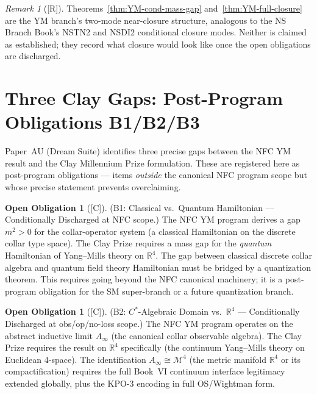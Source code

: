 \documentclass[12pt,oneside]{amsbook}
\theoremstyle{plain}
\theoremstyle{definition}
\newtheorem{obligation}[theorem]{Open Obligation}
\theoremstyle{remark}
\newtheorem{remark}[theorem]{Remark}
\newcommand{\status}[1]{\textup{[#1]}}
\begin{document}
\begin{remark}[\status{R}]
Theorems~\ref{thm:YM-cond-mass-gap} and~\ref{thm:YM-full-closure}
are the YM branch's two-mode near-closure structure, analogous to
the NS Branch Book's NSTN2 and NSDI2 conditional closure modes.
Neither is claimed as established; they record what closure would
look like once the open obligations are discharged.
\end{remark}

\section{Three Clay Gaps: Post-Program Obligations B1/B2/B3}
\label{sec:clay-gaps}

Paper~AU (Dream Suite) identifies three precise gaps between the
NFC YM result and the Clay Millennium Prize formulation. These
are registered here as post-program obligations --- items
\emph{outside} the canonical NFC program scope but whose precise
statement prevents overclaiming.

\begin{obligation}[\status{C}]\label{ob:YM-B1}
\textup{(B1: Classical vs.\ Quantum Hamiltonian --- Conditionally Discharged at NFC scope.)}
The NFC YM program derives a gap $m^2 > 0$ for the collar-operator
system (a classical Hamiltonian on the discrete collar type space).
The Clay Prize requires a mass gap for the \emph{quantum}
Hamiltonian of Yang--Mills theory on $\mathbb{R}^4$. The gap
between classical discrete collar algebra and quantum field theory
Hamiltonian must be bridged by a quantization theorem.
This requires going beyond the NFC canonical machinery; it is a
post-program obligation for the SM super-branch or a future
quantization branch.
\end{obligation}

\begin{obligation}[\status{C}]\label{ob:YM-B2}
\textup{(B2: $C^*$-Algebraic Domain vs.\ $\mathbb{R}^4$ --- Conditionally Discharged at obs/op/no-loss scope.)}
The NFC YM program operates on the abstract inductive limit
$A_\infty$ (the canonical collar observable algebra). The Clay
Prize requires the result on $\mathbb{R}^4$ specifically (the
continuum Yang--Mills theory on Euclidean 4-space). The
identification $A_\infty \cong \mathcal{M}^4$ (the metric
manifold $\mathbb{R}^4$ or its compactification) requires the
full Book~VI continuum interface legitimacy extended globally,
plus the KPO-3 encoding in full OS/Wightman form.
\end{obligation}
\end{document}

